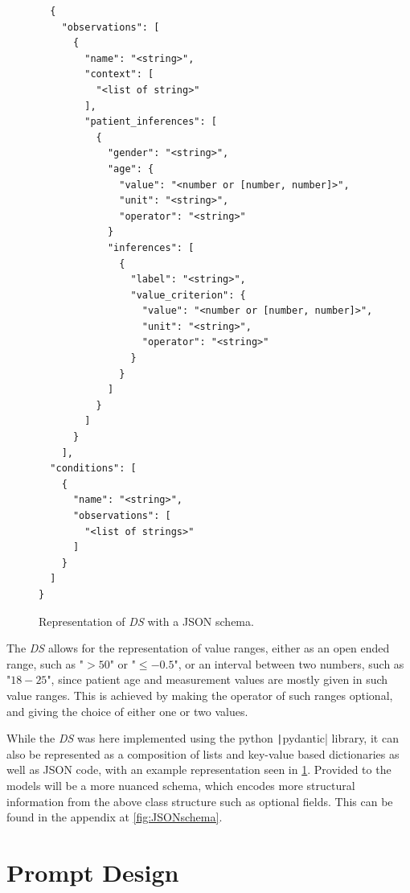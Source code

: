 \documentclass[bs, english]{stthesis}
\begin{document}
\begin{figure}[]
\begin{verbatim}
  {
    "observations": [
      {
        "name": "<string>",
        "context": [
          "<list of string>"
        ],
        "patient_inferences": [
          {
            "gender": "<string>",
            "age": {
              "value": "<number or [number, number]>",
              "unit": "<string>",
              "operator": "<string>"
            }
            "inferences": [
              {
                "label": "<string>",
                "value_criterion": {
                  "value": "<number or [number, number]>",
                  "unit": "<string>",
                  "operator": "<string>"
                }
              }
            ]
          }
        ]
      }
    ],
  "conditions": [
    {
      "name": "<string>",
      "observations": [
        "<list of strings>"
      ]
    }
  ]
}
  \end{verbatim}
  \caption{Representation of \textit{DS} with a JSON schema.}
  \label{fig:JSONexample}
\end{figure}

The \textit{DS} allows for the representation of value ranges, either as an open ended range, such as "$>50$" or "$\le-0.5$", or an interval between two numbers, such as "$18-25$", since patient age and measurement values are mostly given in such value ranges. This is achieved by making the operator of such ranges optional, and giving the choice of either one or two values.

While the \textit{DS} was here implemented using the python \texttt|pydantic| library, it can also be represented as a composition of lists and key-value based dictionaries as well as JSON code, with an example representation seen in \cref{fig:JSONexample}. Provided to the models will be a more nuanced schema, which encodes more structural information from the above class structure such as optional fields. This can be found in the appendix at \cref{fig:JSONschema}.

\section{Prompt Design}
\end{document}
